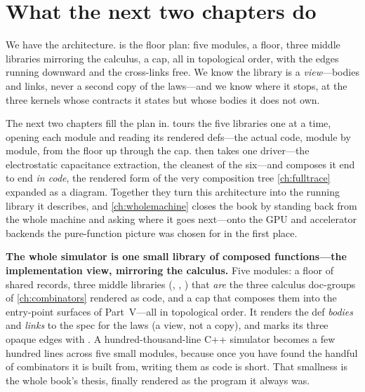 \section{What the next two chapters do}
\label{sec:whatnext}

We have the architecture.  is the floor plan: five modules, a
 floor, three middle libraries mirroring the calculus, a 
cap, all in topological order, with the  edges running downward and
the  cross-links free. We know the library is a \emph{view}---bodies
and links, never a second copy of the laws---and we know where it stops, at the three
 kernels whose contracts it states but whose bodies it does not own.

The next two chapters fill the plan in.  tours the five libraries
one at a time, opening each module and reading its rendered defs---the actual code,
module by module, from the  floor up through the  cap.
 then takes one driver---the electrostatic capacitance extraction,
the cleanest of the six---and composes it end to end \emph{in code}, the rendered
form of the very composition tree \cref{ch:fulltrace} expanded as a diagram. Together
they turn this architecture into the running library it describes, and
\cref{ch:wholemachine} closes the book by standing back from the whole machine and
asking where it goes next---onto the GPU and accelerator backends the pure-function
picture was chosen for in the first place.

\begin{keyidea}
\textbf{The whole simulator is one small library of composed functions---the
implementation view, mirroring the calculus.} Five modules: a  floor of
shared records, three middle libraries (, ,
) that \emph{are} the three calculus doc-groups of
\cref{ch:combinators} rendered as code, and a  cap that composes them
into the entry-point surfaces of Part~V---all in topological order. It renders the
def \emph{bodies} and \emph{links} to the spec for the laws (a view, not a copy), and
marks its three opaque edges with . A hundred-thousand-line C++
simulator becomes a few hundred lines across five small modules, because once you
have found the handful of combinators it is built from, writing them as code is
short. That smallness is the whole book's thesis, finally rendered as the program it
always was.
\end{keyidea}

